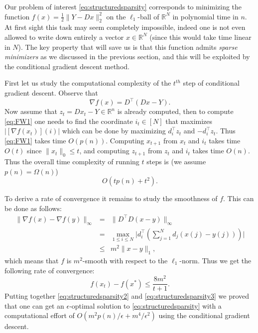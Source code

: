 Our problem of interest \eqref{eq:structuredsparsity} corresponds to minimizing the function $f(x) = \frac{1}{2} \| Y - D x \|^2_2$ on the $\ell_1$-ball of $\mathbb{R}^N$ in polynomial time in $n$. At first sight this task may seem completely impossible, indeed one is not even allowed to write down entirely a vector $x \in \mathbb{R}^N$ (since this would take time linear in $N$). The key property that will save us is that this function admits {\em sparse minimizers} as we discussed in the previous section, and this will be exploited by the conditional gradient descent method. 

First let us study the computational complexity of the $t^{th}$ step of conditional gradient descent. Observe that
$$\nabla f(x) = D^{\top} (D x - Y).$$
Now assume that $z_t = D x_t - Y \in \mathbb{R}^n$ is already computed, then to compute \eqref{eq:FW1} one needs to find the coordinate $i_t \in [N]$ that maximizes $|[\nabla f(x_t)](i)|$ which can be done by maximizing $d_i^{\top} z_t$ and $- d_i^{\top} z_t$. Thus \eqref{eq:FW1} takes time $O(p(n))$. Computing $x_{t+1}$ from $x_t$ and $i_{t}$ takes time $O(t)$ since $\|x_t\|_0 \leq t$, and computing $z_{t+1}$ from $z_t$ and $i_t$ takes time $O(n)$. Thus the overall time complexity of running $t$ steps is (we assume $p(n) = \Omega(n)$) 
\begin{equation}
O(t p(n) + t^2). \label{eq:structuredsparsity2}
\end{equation} 

To derive a rate of convergence it remains to study the smoothness of $f$. This can be done as follows:
\begin{eqnarray*}
\| \nabla f(x) - \nabla f(y) \|_{\infty} & = & \|D^{\top} D (x-y) \|_{\infty} \\
& = & \max_{1 \leq i \leq N} \bigg| d_i^{\top} \left(\sum_{j=1}^N d_j (x(j) - y(j))\right) \bigg| \\
& \leq & m^2 \|x-y\|_1 ,
\end{eqnarray*}
which means that $f$ is $m^2$-smooth with respect to the $\ell_1$-norm. Thus we get the following rate of convergence:
\begin{equation}
f(x_t) - f(x^*) \leq \frac{8 m^2}{t+1} . \label{eq:structuredsparsity3}
\end{equation}
Putting together \eqref{eq:structuredsparsity2} and \eqref{eq:structuredsparsity3} we proved that one can get an $\epsilon$-optimal solution to \eqref{eq:structuredsparsity} with a computational effort of $O(m^2 p(n)/\epsilon + m^4/\epsilon^2)$ using the conditional gradient descent.

